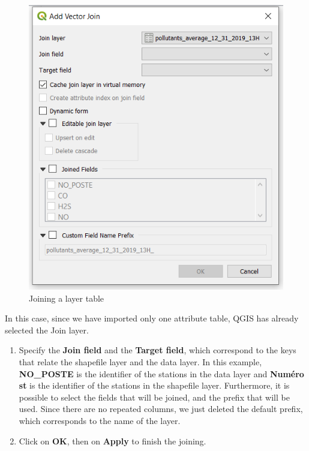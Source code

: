 \documentclass[]{book}
\theoremstyle{definition}
\theoremstyle{definition}
\theoremstyle{definition}
\theoremstyle{remark}
\begin{document}
\begin{figure}

{\centering \includegraphics[width=7.26in]{figures/Joins_Dialog_Box_2} 

}

\caption{Joining a layer table}\label{fig:unnamed-chunk-15}
\end{figure}

In this case, since we have imported only one attribute table, QGIS has
already selected the Join layer.

\begin{enumerate}
\def\labelenumi{\arabic{enumi}.}
\setcounter{enumi}{2}
\item
  Specify the \textbf{Join field} and the \textbf{Target field}, which
  correspond to the keys that relate the shapefile layer and the data
  layer. In this example, \textbf{NO\_POSTE} is the identifier of the
  stations in the data layer and \textbf{Numéro st} is the identifier of
  the stations in the shapefile layer. Furthermore, it is possible to
  select the fields that will be joined, and the prefix that will be
  used. Since there are no repeated columns, we just deleted the default
  prefix, which corresponds to the name of the layer.
\item
  Click on \textbf{OK}, then on \textbf{Apply} to finish the joining.
\end{enumerate}
\end{document}

